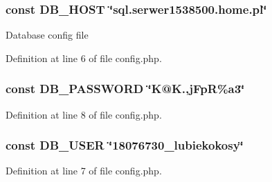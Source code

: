 \subsubsection[{D\+B\+\_\+\+H\+O\+S\+T}]{\setlength{\rightskip}{0pt plus 5cm}const D\+B\+\_\+\+H\+O\+S\+T \char`\"{}sql.\+serwer1538500.\+home.\+pl\char`\"{}}\label{php_2config_8php_a293363d7988627f671958e2d908c202a}
Database config file 

Definition at line 6 of file config.\+php.

\hypertarget{php_2config_8php_a4dca144fafcc7bd3f71cb5778afcdd13}{}
\subsubsection[{D\+B\+\_\+\+P\+A\+S\+S\+W\+O\+R\+D}]{\setlength{\rightskip}{0pt plus 5cm}const D\+B\+\_\+\+P\+A\+S\+S\+W\+O\+R\+D \char`\"{}K@K.,j\+Fp\+R\%a3\char`\"{}}\label{php_2config_8php_a4dca144fafcc7bd3f71cb5778afcdd13}


Definition at line 8 of file config.\+php.

\hypertarget{php_2config_8php_a1d1d99f8e08f387d84fe9848f3357156}{}
\subsubsection[{D\+B\+\_\+\+U\+S\+E\+R}]{\setlength{\rightskip}{0pt plus 5cm}const D\+B\+\_\+\+U\+S\+E\+R \char`\"{}18076730\+\_\+lubiekokosy\char`\"{}}\label{php_2config_8php_a1d1d99f8e08f387d84fe9848f3357156}


Definition at line 7 of file config.\+php.

